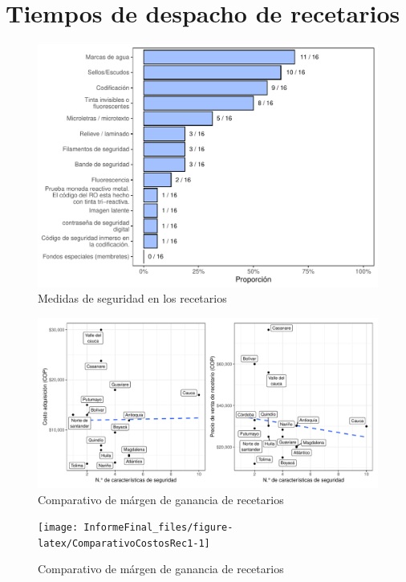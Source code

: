 \documentclass[
]{book}
\begin{document}
\hypertarget{tiempos-de-despacho-de-recetarios}{%
\section{Tiempos de despacho de recetarios}\label{tiempos-de-despacho-de-recetarios}}

\begin{figure}
\includegraphics[width=0.9\linewidth]{InformeFinal_files/figure-latex/MedidasSeguridadRec-1} \caption{Medidas de seguridad en los recetarios}\label{fig:MedidasSeguridadRec}
\end{figure}

\begin{figure}
\includegraphics[width=0.9\linewidth]{InformeFinal_files/figure-latex/ComparativoCostosRec-1} \caption{Comparativo de márgen de ganancia de recetarios}\label{fig:ComparativoCostosRec}
\end{figure}
\begin{figure}
\texttt{[image: InformeFinal\_files/figure-latex/ComparativoCostosRec1-1]} \caption{Comparativo de márgen de ganancia de recetarios}\label{fig:ComparativoCostosRec1}
\end{figure}
\end{document}
